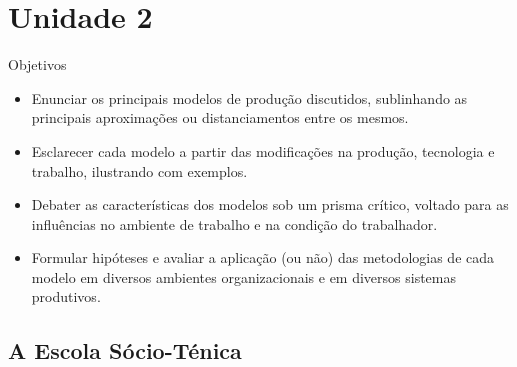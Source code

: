 \documentclass{article}
\begin{document}
\section{Unidade 2}

Objetivos

\begin{itemize}
    \item Enunciar os principais modelos de produção discutidos, sublinhando as principais aproximações ou distanciamentos entre os mesmos.
    \item Esclarecer cada modelo a partir das modificações na produção, tecnologia e trabalho, ilustrando com exemplos.
    \item Debater as características dos modelos sob um prisma crítico, voltado para as influências no ambiente de trabalho e na condição do trabalhador.
    \item Formular hipóteses e avaliar a aplicação (ou não) das metodologias de cada modelo em diversos ambientes organizacionais e em diversos sistemas produtivos.
\end{itemize}

\subsection{A Escola Sócio-Ténica}
\end{document}
